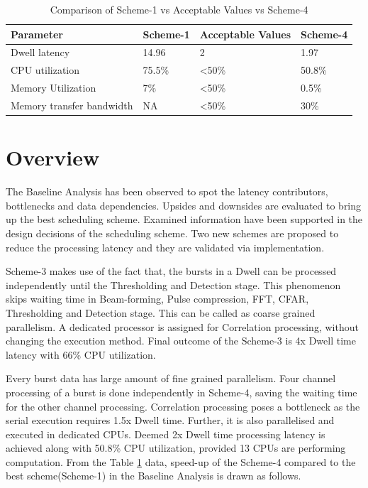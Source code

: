 \begin{table}[h!]
	\centering
	\begin{tabular}{|l|l|l|l|} 
	 \hline
	 \textbf{Parameter} & \textbf{Scheme-1} & \textbf{Acceptable Values} & \textbf{Scheme-4}\\
	 \hline
	 Dwell latency &  14.96 & 2 & 1.97 \\ \hline
	 CPU utilization & 75.5\% & \textless 50\% & 50.8\% \\ \hline
	 Memory Utilization & 7\% & \textless 50\%  & 0.5\% \\ \hline
	 Memory transfer bandwidth & NA & \textless 50\% & 30\%  \\ \hline
	\end{tabular}
	\caption{Comparison of Scheme-1 vs Acceptable Values vs Scheme-4}
	\label{tbl:mm:scheme5_comparison}
\end{table}

\section{Overview}
The Baseline Analysis has been observed to spot the latency contributors, bottlenecks and data dependencies. Upsides and downsides are evaluated to bring up the best scheduling scheme. Examined information have been supported in the design decisions of the scheduling scheme. Two new schemes are proposed to reduce the processing latency and they are validated via implementation. \vspace*{0.2cm}

Scheme-3 makes use of the fact that, the bursts in a Dwell can be processed independently until the Thresholding and Detection stage. This phenomenon skips waiting time in Beam-forming, Pulse compression, FFT, CFAR, Thresholding and Detection stage. This can be called as coarse grained parallelism. A dedicated processor is assigned for Correlation processing, without changing the execution method. Final outcome of the Scheme-3 is 4x Dwell time latency with 66\% CPU utilization. \vspace*{0.2cm}

Every burst data has large amount of fine grained parallelism. Four channel processing of a burst is done independently in Scheme-4, saving the waiting time for the other channel processing.  Correlation processing poses a bottleneck as the serial execution requires 1.5x Dwell time. Further, it is also parallelised and executed in dedicated CPUs. Deemed 2x Dwell time processing latency is achieved along with 50.8\% CPU utilization, provided 13 CPUs are performing computation. From the Table \ref{tbl:mm:scheme5_comparison} data, speed-up of the Scheme-4 compared to the best scheme(Scheme-1) in the Baseline Analysis is drawn as follows. \\

